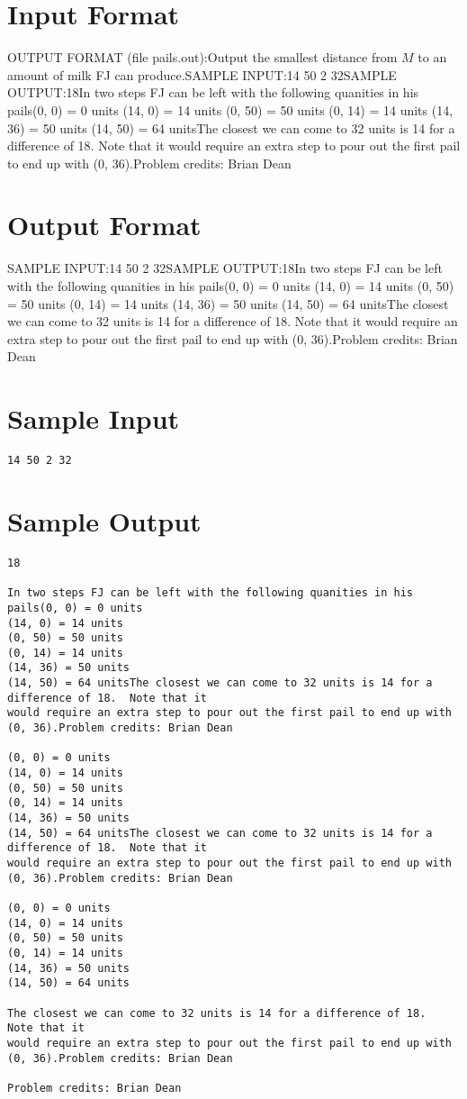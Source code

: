 \documentclass[12pt]{article}
\begin{document}
\section*{Input Format}
OUTPUT FORMAT (file pails.out):Output the smallest distance from $M$ to an amount of milk FJ can produce.SAMPLE INPUT:14 50 2 32SAMPLE OUTPUT:18In two steps FJ can be left with the following quanities in his pails(0, 0) = 0 units
(14, 0) = 14 units
(0, 50) = 50 units
(0, 14) = 14 units
(14, 36) = 50 units
(14, 50) = 64 unitsThe closest we can come to 32 units is 14 for a difference of 18.  Note that it
would require an extra step to pour out the first pail to end up with (0, 36).Problem credits: Brian Dean

\section*{Output Format}
SAMPLE INPUT:14 50 2 32SAMPLE OUTPUT:18In two steps FJ can be left with the following quanities in his pails(0, 0) = 0 units
(14, 0) = 14 units
(0, 50) = 50 units
(0, 14) = 14 units
(14, 36) = 50 units
(14, 50) = 64 unitsThe closest we can come to 32 units is 14 for a difference of 18.  Note that it
would require an extra step to pour out the first pail to end up with (0, 36).Problem credits: Brian Dean

\section*{Sample Input}
\begin{verbatim}
14 50 2 32
\end{verbatim}

\section*{Sample Output}
\begin{verbatim}
18

In two steps FJ can be left with the following quanities in his pails(0, 0) = 0 units
(14, 0) = 14 units
(0, 50) = 50 units
(0, 14) = 14 units
(14, 36) = 50 units
(14, 50) = 64 unitsThe closest we can come to 32 units is 14 for a difference of 18.  Note that it
would require an extra step to pour out the first pail to end up with (0, 36).Problem credits: Brian Dean

(0, 0) = 0 units
(14, 0) = 14 units
(0, 50) = 50 units
(0, 14) = 14 units
(14, 36) = 50 units
(14, 50) = 64 unitsThe closest we can come to 32 units is 14 for a difference of 18.  Note that it
would require an extra step to pour out the first pail to end up with (0, 36).Problem credits: Brian Dean

(0, 0) = 0 units
(14, 0) = 14 units
(0, 50) = 50 units
(0, 14) = 14 units
(14, 36) = 50 units
(14, 50) = 64 units

The closest we can come to 32 units is 14 for a difference of 18.  Note that it
would require an extra step to pour out the first pail to end up with (0, 36).Problem credits: Brian Dean

Problem credits: Brian Dean
\end{verbatim}
\end{document}
